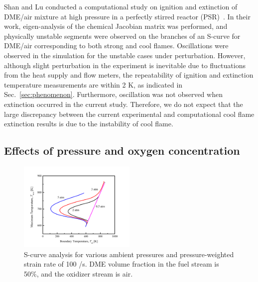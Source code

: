 \documentclass[review,3p,times]{elsarticle}
\begin{document}
\textcolor{Rev2}{Shan and Lu conducted a computational study on ignition and extinction of DME/air mixture at high pressure in a perfectly stirred reactor (PSR)~\cite{shan12b}.  In their work, eigen-analysis of the chemical Jacobian matrix was performed, and physically unstable segments were observed on the branches of an S-curve for DME/air corresponding to both strong and cool flames.  Oscillations were observed in the simulation for the unstable cases under perturbation.  However, although slight perturbation in the experiment is inevitable due to fluctuations from the heat supply and flow meters, the repeatability of ignition and extinction temperature measurements are within 2 K, as indicated in Sec.~\ref{sec:phenomenon}.  Furthermore, oscillation was not observed when extinction occurred in the current study.  Therefore, we do not expect that the large discrepancy between the current experimental and computational cool flame extinction results is due to the instability of cool flame.}

\subsection{Effects of pressure and oxygen concentration}

\begin{figure}[t]
  \centering
  \scriptsize
  \includegraphics[trim=6.5mm 7.5mm 7mm 8mm, clip=true, width=0.5\textwidth]{eff_P.png}
  \normalsize
  \caption{S-curve analysis for various ambient pressures and pressure-weighted strain rate of 100 /s.  DME volume fraction in the fuel stream is 50\%, and the oxidizer stream is air.}
  \label{fig:eff_P}
\end{figure}
\end{document}
